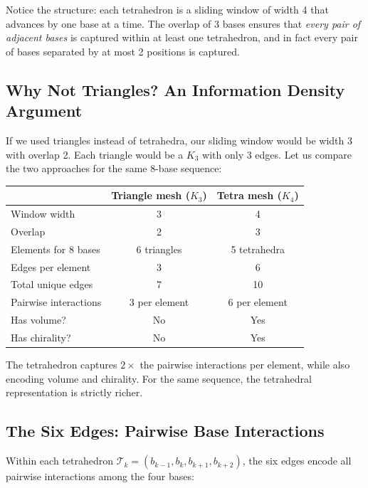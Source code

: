 Notice the structure: each tetrahedron is a sliding window of width 4 that
advances by one base at a time. The overlap of 3 bases ensures that
\emph{every pair of adjacent bases} is captured within at least one tetrahedron,
and in fact every pair of bases separated by at most 2 positions is captured.

\subsection{Why Not Triangles? An Information Density Argument}

If we used triangles instead of tetrahedra, our sliding window would be width 3
with overlap 2. Each triangle would be a $K_3$ with only 3 edges. Let us
compare the two approaches for the same 8-base sequence:

\begin{center}
\renewcommand{\arraystretch}{1.15}
\begin{tabular}{lcc}
\toprule
& \textbf{Triangle mesh} ($K_3$) & \textbf{Tetra mesh} ($K_4$) \\
\midrule
Window width & 3 & 4 \\
Overlap & 2 & 3 \\
Elements for 8 bases & 6 triangles & 5 tetrahedra \\
Edges per element & 3 & 6 \\
Total unique edges & 7 & 10 \\
Pairwise interactions & 3 per element & 6 per element \\
Has volume? & No & Yes \\
Has chirality? & No & Yes \\
\bottomrule
\end{tabular}
\end{center}

The tetrahedron captures $2\times$ the pairwise interactions per element, while
also encoding volume and chirality. For the same sequence, the tetrahedral
representation is strictly richer.

\subsection{The Six Edges: Pairwise Base Interactions}
\label{sec:six-edges}

Within each tetrahedron $\mathcal{T}_k = (b_{k-1}, b_k, b_{k+1}, b_{k+2})$, the six edges
encode all pairwise interactions among the four bases:

